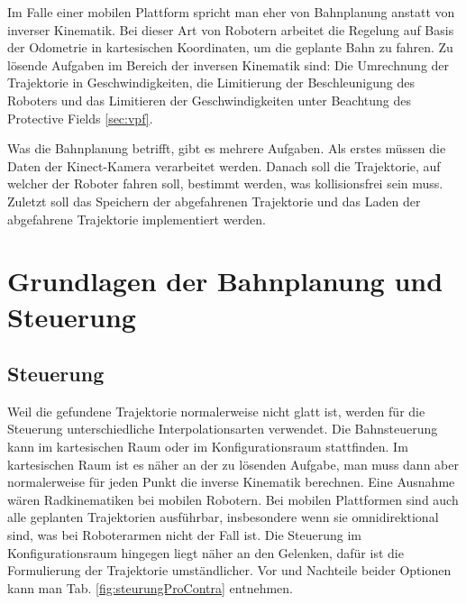 Im Falle einer mobilen Plattform spricht man eher von Bahnplanung anstatt von inverser Kinematik.
Bei dieser Art von Robotern arbeitet die Regelung auf Basis der Odometrie in kartesischen Koordinaten, um die geplante Bahn zu fahren.
Zu lösende Aufgaben im Bereich der inversen Kinematik sind:
Die Umrechnung der Trajektorie in Geschwindigkeiten, die Limitierung der Beschleunigung des Roboters und das Limitieren der Geschwindigkeiten unter Beachtung des Protective Fields \ref{sec:vpf}.

Was die Bahnplanung betrifft, gibt es mehrere Aufgaben.
Als erstes müssen die Daten der Kinect-Kamera verarbeitet werden.
Danach soll die Trajektorie, auf welcher der Roboter fahren soll, bestimmt werden, was kollisionsfrei sein muss.
Zuletzt soll das Speichern der abgefahrenen Trajektorie und das Laden der abgefahrene Trajektorie implementiert werden.



\section{Grundlagen der Bahnplanung und Steuerung}


\subsection{Steuerung}
\label{bahnplanung_steuerung_sec}

Weil die gefundene Trajektorie normalerweise nicht glatt ist, werden für die Steuerung unterschiedliche Interpolationsarten verwendet.
Die Bahnsteuerung kann im kartesischen Raum oder im Konfigurationsraum stattfinden.
Im kartesischen Raum ist es näher an der zu lösenden Aufgabe, man muss dann aber normalerweise für jeden Punkt die inverse Kinematik berechnen.
Eine Ausnahme wären Radkinematiken bei mobilen Robotern.
Bei mobilen Plattformen sind auch alle geplanten Trajektorien ausführbar, insbesondere wenn sie omnidirektional sind, was bei Roboterarmen nicht der Fall ist.
Die Steuerung im Konfigurationsraum hingegen liegt näher an den Gelenken, dafür ist die Formulierung der Trajektorie umständlicher.
Vor und Nachteile beider Optionen kann man Tab. \ref{fig:steurungProContra} entnehmen.



